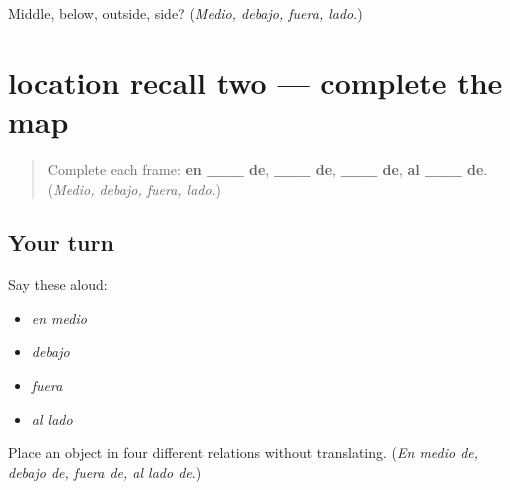 \begin{tcolorbox}[breakable,colback=teal!4,colframe=teal!35!black,title={Before you move on}]
Middle, below, outside, side? (\emph{Medio, debajo, fuera, lado}.)
\end{tcolorbox}
\section[(review)]{location recall two — complete the map}

\label{lesson:ES-C407-location-recall-2}



\begin{quote}
Complete each frame: \textbf{en \_\_\_ de}, \textbf{\_\_\_ de}, \textbf{\_\_\_ de}, \textbf{al \_\_\_ de}. (\emph{Medio, debajo, fuera, lado}.)
\end{quote}

\subsection*{Your turn}
Say these aloud:

\begin{itemize}
\raggedright
  \item \emph{en medio}
  \item \emph{debajo}
  \item \emph{fuera}
  \item \emph{al lado}
\end{itemize}

\begin{tcolorbox}[breakable,colback=teal!4,colframe=teal!35!black,title={Before you move on}]
Place an object in four different relations without translating. (\emph{En medio de, debajo de, fuera de, al lado de}.)
\end{tcolorbox}
